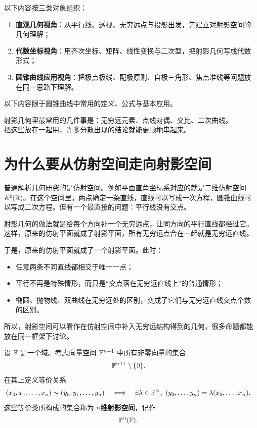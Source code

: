 以下内容按三类对象组织：

\begin{enumerate}
    \item \textbf{直观几何视角}：从平行线、透视、无穷远点与投影出发，先建立对射影空间的几何理解；
    \item \textbf{代数坐标视角}：用齐次坐标、矩阵、线性变换与二次型，把射影几何写成代数形式；
    \item \textbf{圆锥曲线应用视角}：把极点极线、配极原则、自极三角形、焦点准线等问题放在同一思路下理解。
\end{enumerate}

以下内容限于圆锥曲线中常用的定义、公式与基本应用。

\begin{conclusion}
射影几何里最常用的几件事是：无穷远元素、点线对偶、交比、二次曲线。\\
把这些放在一起用，许多分散出现的结论就能更顺地串起来。
\end{conclusion}

\section{为什么要从仿射空间走向射影空间}
普通解析几何研究的是仿射空间。例如平面直角坐标系对应的就是二维仿射空间 $\mathbb{A}^2(\mathbb{R})$。在这个空间里，两点确定一条直线，直线可以写成一次方程，圆锥曲线可以写成二次方程。但有一个最直接的问题：平行线没有交点。

射影几何的做法就是给每个方向补一个无穷远点，让同方向的平行直线都经过它。这样，原来的仿射平面就成了射影平面，所有无穷远点合在一起就是无穷远直线。

于是，原来的仿射平面就成了一个射影平面。此时：

\begin{itemize}
    \item 任意两条不同直线都相交于唯一一点；
    \item 平行不再是特殊情形，而只是“交点落在无穷远直线上”的普通情形；
    \item 椭圆、抛物线、双曲线在无穷远处的区别，变成了它们与无穷远直线交点个数的区别。
\end{itemize}

所以，射影空间可以看作在仿射空间中补入无穷远结构得到的几何，很多命题都能放在同一框架下讨论。

\begin{definition}
设 $\mathbb{F}$ 是一个域。考虑向量空间 $\mathbb{F}^{n+1}$ 中所有非零向量的集合
\[
\mathbb{F}^{n+1}\setminus\{ 0\}.
\]
在其上定义等价关系
\[
(x_0,x_1,\dots,x_n)\sim (y_0,y_1,\dots,y_n)
\quad \Longleftrightarrow \quad
\exists \lambda\in \F^\times,\ (y_0,\dots,y_n)=\lambda(x_0,\dots,x_n).
\]
这些等价类所构成的集合称为 \textbf{$n$维射影空间}，记作
\[
\mathbb{P}^n(\mathbb{F}).
\]
\end{definition}

